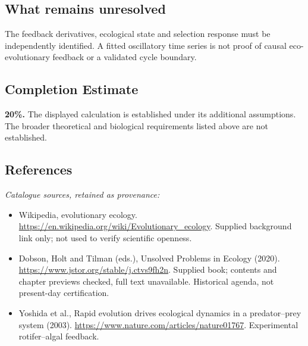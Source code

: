 \documentclass[11pt]{article}
\begin{document}
\subsection{What remains unresolved}
The feedback derivatives, ecological state and selection response must be independently identified. A fitted oscillatory time series is not proof of causal eco-evolutionary feedback or a validated cycle boundary.
\subsection{Completion Estimate}
\textbf{20\%.} The displayed calculation is established under its additional assumptions. The broader theoretical and biological requirements listed above are not established.
\subsection{References}
\noindent\emph{Catalogue sources, retained as provenance:}
\begin{itemize}
\item Wikipedia, evolutionary ecology. \url{https://en.wikipedia.org/wiki/Evolutionary_ecology}. Supplied background link only; not used to verify scientific openness.
\item Dobson, Holt and Tilman (eds.), Unsolved Problems in Ecology (2020). \url{https://www.jstor.org/stable/j.ctvs9fh2n}. Supplied book; contents and chapter previews checked, full text unavailable. Historical agenda, not present-day certification.
\item Yoshida et al., Rapid evolution drives ecological dynamics in a predator--prey system (2003). \url{https://www.nature.com/articles/nature01767}. Experimental rotifer--algal feedback.
\end{itemize}
\end{document}
